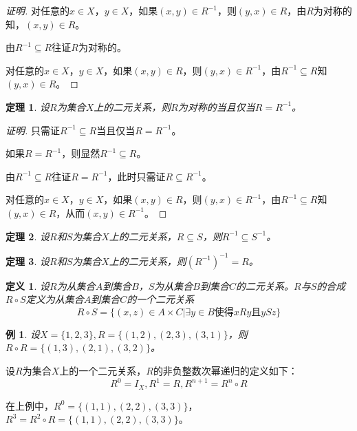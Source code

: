 \documentclass{book}[oneside]
\newtheorem{Def}{定义}[chapter]
\newtheorem{Thm}{定理}[chapter]
\newtheorem{Example}{例}[chapter]
\begin{document}
\begin{CJK*}{UTF8}{gbsn}
\begin{proof}[证明]
对任意的$x\in X$，$y\in X$，如果$(x,y)\in R^{-1}$，则$(y,x)\in R$，由$R$为对称的知，$(x,y)\in R$。

由$R^{-1}\subseteq R$往证$R$为对称的。

对任意的$x\in X$，$y\in X$，如果$(x,y)\in R$，则$(y,x)\in R^{-1}$，由$R^{-1}\subseteq R$知$(y,x)\in R$。

\end{proof}
  \begin{Thm}
    设$R$为集合$X$上的二元关系，则$R$为对称的当且仅当$R=R^{-1}$。
  \end{Thm}  
  \begin{proof}[证明]
    只需证$R^{-1}\subseteq R$当且仅当$R=R^{-1}$。

    如果$R=R^{-1}$，则显然$R^{-1}\subseteq R$。

    由$R^{-1}\subseteq R$往证$R=R^{-1}$，此时只需证$R\subseteq R^{-1}$。

    对任意的$x\in X$，$y\in X$，如果$(x,y)\in R$，则$(y,x)\in R^{-1}$，由$R^{-1}\subseteq R$知$(y,x)\in R$，从而$(x,y)\in R^{-1}$。
  \end{proof}
  \begin{Thm}
    设$R$和$S$为集合$X$上的二元关系，$R\subseteq S$，则$R^{-1}\subseteq S^{-1}$。
  \end{Thm}  
  \begin{Thm}
    设$R$和$S$为集合$X$上的二元关系，则$(R^{-1})^{-1}=R$。
  \end{Thm}  


    \begin{Def}
    设$R$为从集合$A$到集合$B$，$S$为从集合$B$到集合$C$的二元关系。$R$与$S$的合成
    $R\circ S$定义为从集合$A$到集合$C$的一个二元关系
    \[R\circ S = \{(x,z)\in A \times C |  \exists y \in B \text{使得} xRy \text{且} ySz\}\]
  \end{Def}

  \begin{Example}
    设$X=\{1,2,3\}, R=\{(1,2),(2,3),(3,1)\}$，则$R\circ R=\{(1,3),(2,1),(3,2)\}$。
  \end{Example}
  

  设$R$为集合$X$上的一个二元关系，$R$的非负整数次幂递归的定义如下：
  \[R^0=I_X,R^1=R,R^{n+1}=R^{n}\circ R\]

  在上例中，$R^0=\{(1,1),(2,2),(3,3)\}$，$R^3=R^2\circ R=\{(1,1),(2,2),(3,3)\}$。



\end{CJK*}
\end{document}
